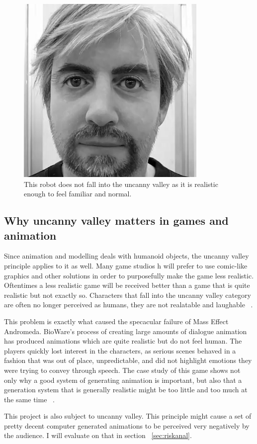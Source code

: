 \begin{figure}[!ht]
\centerline{\includegraphics[scale=0.45]{img/realrobot.png}}
\caption{This robot does not fall into the uncanny valley as it is realistic enough to feel familiar and normal.}\label{fig:realrobot}
\end{figure}

\subsection{Why uncanny valley matters in games and animation}

Since animation and modelling deals with humanoid objects, the uncanny valley principle applies to it as well. Many game studios h will prefer to use comic-like graphics and other solutions in order to purposefully make the game less realistic. Oftentimes a less realistic game will be received better than a game that is quite realistic but not exactly so. Characters that fall into the uncanny valley category are often no longer perceived as humans, they are not realatable and laughable ~\cite{uncannygames}.

This problem is exactly what caused the specacular failure of Mass Effect Andromeda. BioWare's  process of creating large amounts of dialogue animation has produced animations which are quite realistic but do not feel human. The players quickly lost interest in the characters, as serious scenes behaved in a fashion that was out of place, unpredictable, and did not highlight emotions they were trying to convey through speech. The case study of this game shows not only why a good system of generating animation is important, but also that a generation system that is generally realistic might be too little and too much at the same time ~\cite{uncannyandromeda}.

This project is also subject to uncanny valley. This principle might cause a set of pretty decent computer generated animations to be perceived very negatively by the audience. I will evaluate on that in section ~\ref{sec:riskanal}.







